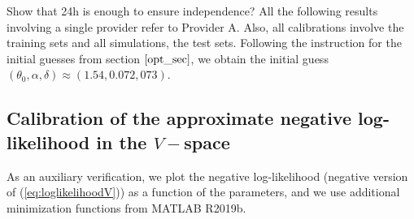 \documentclass[11pt]{article}
\theoremstyle{definition}
\begin{document}
{ \color{red} Show that 24h is enough to ensure independence?}
All the following results involving a single provider refer to Provider A. Also, all calibrations involve the training sets and all simulations, the test sets. Following the instruction for the initial guesses from section $\ref{opt_sec}$, we obtain the initial guess $(\theta_0,\alpha,\delta)\approx(1.54,0.072,073)$.

\subsection{Calibration of the approximate negative log-likelihood in the $V-$space}

As an auxiliary verification, we plot the negative log-likelihood (negative version of (\ref{eq:loglikelihoodV})) as a function of the parameters, and we use additional minimization functions from MATLAB R2019b.
\end{document}

